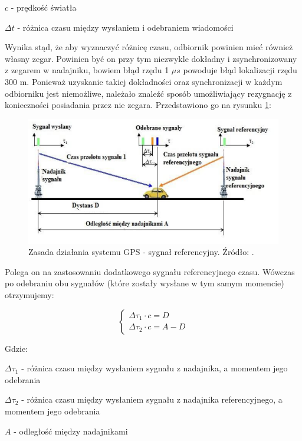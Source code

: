 $c$ - prędkość światła

$\Delta t$ - różnica czasu między wysłaniem i odebraniem wiadomości

Wynika stąd, że aby wyznaczyć różnicę czasu, odbiornik powinien mieć również własny zegar. Powinien być on przy tym niezwykle dokładny i zsynchronizowany z zegarem w nadajniku, bowiem błąd rzędu 1 $\mu s$ powoduje błąd lokalizacji rzędu 300 m. Ponieważ uzyskanie takiej dokładności oraz synchronizacji w każdym odbiorniku jest niemożliwe, należało znaleźć sposób umożliwiający rezygnację z konieczności posiadania przez nie zegara. Przedstawiono go na rysunku \ref{fig:image_gps_basics2}:

\begin{figure}[H]
	\centering
	\includegraphics[width=12cm]{img/theory/GPS/gps_basics2.png}
	\caption{Zasada działania systemu GPS - sygnał referencyjny. Źródło: \cite{inzynierka}.}
	\label{fig:image_gps_basics2}
\end{figure}

Polega on na zastosowaniu dodatkowego sygnału referencyjnego czasu. Wówczas po odebraniu obu sygnałów (które zostały wysłane w tym samym momencie) otrzymujemy:

\begin{equation}
\begin{cases}
\Delta \tau_1 \cdot c = D \\ 
\Delta \tau_2 \cdot c = A - D
\end{cases}
\end{equation}

\pagebreak
Gdzie:

$\Delta\tau_1$ - różnica czasu między wysłaniem sygnału z nadajnika, a momentem jego odebrania

$\Delta\tau_2$ - różnica czasu między wysłaniem sygnału z nadajnika referencyjnego, a momentem jego odebrania

$A$ - odległość między nadajnikami

